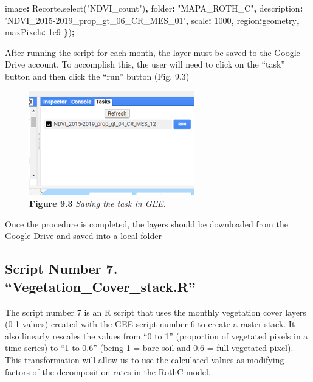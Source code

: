 \documentclass[
  10pt,
  b5paper,
]{book}
\newenvironment{Shaded}{\begin{snugshade}}{\end{snugshade}}
\newcommand{\AttributeTok}[1]{\textcolor[rgb]{0.77,0.63,0.00}{#1}}
\newcommand{\DataTypeTok}[1]{\textcolor[rgb]{0.13,0.29,0.53}{#1}}
\newcommand{\DecValTok}[1]{\textcolor[rgb]{0.00,0.00,0.81}{#1}}
\newcommand{\FloatTok}[1]{\textcolor[rgb]{0.00,0.00,0.81}{#1}}
\newcommand{\NormalTok}[1]{#1}
\newcommand{\OperatorTok}[1]{\textcolor[rgb]{0.81,0.36,0.00}{\textbf{#1}}}
\newcommand{\StringTok}[1]{\textcolor[rgb]{0.31,0.60,0.02}{#1}}
\newcommand{\VariableTok}[1]{\textcolor[rgb]{0.00,0.00,0.00}{#1}}
\begin{document}
\begin{Shaded}
\begin{Highlighting}[]
          \DataTypeTok{image}\OperatorTok{:} \VariableTok{Recorte}\NormalTok{.}\AttributeTok{select}\NormalTok{(}\StringTok{"NDVI_count"}\NormalTok{)}\OperatorTok{,}
          \DataTypeTok{folder}\OperatorTok{:} \StringTok{"MAPA_ROTH_C"}\OperatorTok{,}
          \DataTypeTok{description}\OperatorTok{:} \StringTok{'NDVI_2015-2019_prop_gt_06_CR_MES_01'}\OperatorTok{,} 
          \DataTypeTok{scale}\OperatorTok{:} \DecValTok{1000}\OperatorTok{,}
          \DataTypeTok{region}\OperatorTok{:}\NormalTok{geometry}\OperatorTok{,}
          \DataTypeTok{maxPixels}\OperatorTok{:} \FloatTok{1e9}     
\OperatorTok{\}}\NormalTok{)}\OperatorTok{;}
\end{Highlighting}
\end{Shaded}

After running the script for each month, the layer must be saved to the Google Drive account. To accomplish this, the user will need to click on the ``task'' button and then click the ``run'' button (Fig. 9.3)

\begin{figure}
\centering
\includegraphics{images/Figure_9.3.png}
\caption{\textbf{Figure 9.3} \emph{Saving the task in GEE.}}
\end{figure}

Once the procedure is completed, the layers should be downloaded from the Google Drive and saved into a local folder

\hypertarget{script-number-7.-vegetation_cover_stack.r}{%
\subsection{Script Number 7. ``Vegetation\_Cover\_stack.R''}\label{script-number-7.-vegetation_cover_stack.r}}

The script number 7 is an R script that uses the monthly vegetation cover layers (0-1 values) created with the GEE script number 6 to create a raster stack. It also linearly rescales the values from ``0 to 1'' (proportion of vegetated pixels in a time series) to ``1 to 0.6'' (being 1 = bare soil and 0.6 = full vegetated pixel). This transformation will allow us to use the calculated values as modifying factors of the decomposition rates in the RothC model.
\end{document}
